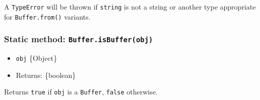 A \texttt{TypeError} will be thrown if \texttt{string} is not a string
or another type appropriate for \texttt{Buffer.from()} variants.

\subsubsection{\texorpdfstring{Static method:
\texttt{Buffer.isBuffer(obj)}}{Static method: Buffer.isBuffer(obj)}}\label{static-method-buffer.isbufferobj}

\begin{itemize}
\tightlist
\item
  \texttt{obj} \{Object\}
\item
  Returns: \{boolean\}
\end{itemize}

Returns \texttt{true} if \texttt{obj} is a \texttt{Buffer},
\texttt{false} otherwise.

\begin{Shaded}
\begin{Highlighting}[]
\NormalTok{ \{ }\NormalTok{ \} } \OperatorTok{;}

\NormalTok{(}\NormalTok{(}\NormalTok{))}\OperatorTok{;} 
\NormalTok{(}\NormalTok{(}\NormalTok{))}\OperatorTok{;} 
\NormalTok{(}\NormalTok{)}\OperatorTok{;} 
\NormalTok{([])}\OperatorTok{;} 
\NormalTok{(} \NormalTok{(}\NormalTok{))}\OperatorTok{;} 
\end{Highlighting}
\end{Shaded}

